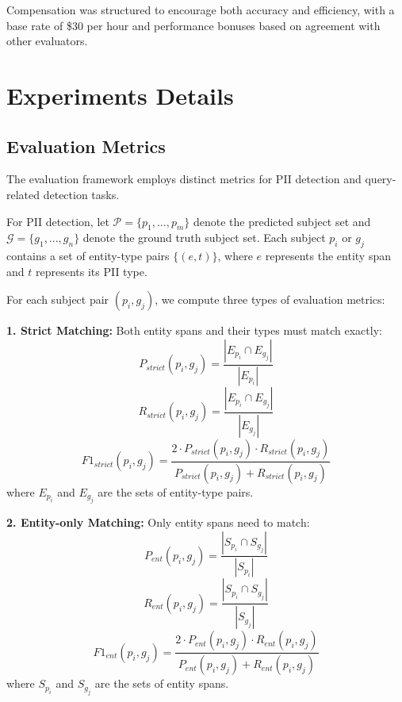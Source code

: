 Compensation was structured to encourage both accuracy and efficiency, with a base rate of \$30 per hour and performance bonuses based on agreement with other evaluators.

\section{Experiments Details}
\subsection{Evaluation Metrics}
\label{sec:metrics}
The evaluation framework employs distinct metrics for PII detection and query-related detection tasks.

For PII detection, let $\mathcal{P} = \{p_1, ..., p_m\}$ denote the predicted subject set and $\mathcal{G} = \{g_1, ..., g_n\}$ denote the ground truth subject set. Each subject $p_i$ or $g_j$ contains a set of entity-type pairs $\{(e, t)\}$, where $e$ represents the entity span and $t$ represents its PII type.

For each subject pair $(p_i, g_j)$, we compute three types of evaluation metrics:

\noindent\textbf{1. Strict Matching:} Both entity spans and their types must match exactly:
\begin{equation}
    P_{strict}(p_i, g_j) = \frac{|E_{p_i} \cap E_{g_j}|}{|E_{p_i}|}
\end{equation}
\begin{equation}
    R_{strict}(p_i, g_j) = \frac{|E_{p_i} \cap E_{g_j}|}{|E_{g_j}|}
\end{equation}
\begin{equation}
    F1_{strict}(p_i, g_j) = \frac{2 \cdot P_{strict}(p_i, g_j) \cdot R_{strict}(p_i, g_j)}{P_{strict}(p_i, g_j) + R_{strict}(p_i, g_j)}
\end{equation}
where $E_{p_i}$ and $E_{g_j}$ are the sets of entity-type pairs.

\noindent\textbf{2. Entity-only Matching:} Only entity spans need to match:
\begin{equation}
    P_{ent}(p_i, g_j) = \frac{|S_{p_i} \cap S_{g_j}|}{|S_{p_i}|}
\end{equation}
\begin{equation}
    R_{ent}(p_i, g_j) = \frac{|S_{p_i} \cap S_{g_j}|}{|S_{g_j}|}
\end{equation}
\begin{equation}
    F1_{ent}(p_i, g_j) = \frac{2 \cdot P_{ent}(p_i, g_j) \cdot R_{ent}(p_i, g_j)}{P_{ent}(p_i, g_j) + R_{ent}(p_i, g_j)}
\end{equation}
where $S_{p_i}$ and $S_{g_j}$ are the sets of entity spans.

